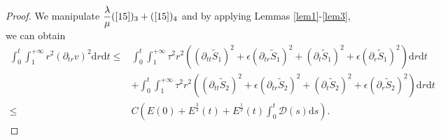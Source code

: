 \documentclass[10pt,reqno]{amsart}
\numberwithin{equation}{section}
\begin{document}
	\begin{proof}
		We manipulate $\dfrac{\lambda}{\mu}(\ref{15})_{3}+(\ref{15})_{4}$
		and by applying Lemmas \ref{lem1}-\ref{lem3}, we can obtain
		\begin{equation}\label{2dis1}
			\begin{aligned}
				\int_0^t\int_{1}^{+\infty}r^2(\partial_{tr}v)^2
				\mathrm{d}r\mathrm{d}t
				\leq&\int_0^t\int_{1}^{+\infty}\tau^2r^2((\partial_{tt}\tilde{S}_1)^2+\epsilon(\partial_{tr}\tilde{S}_1)^2+(\partial_{t}\tilde{S}_1)^2+\epsilon(\partial_{r}\tilde{S}_1)^2)\mathrm{d}r\mathrm{d}t\\
				&+\int_0^t\int_{1}^{+\infty}\tau^2r^2((\partial_{tt}\tilde{S}_2)^2+\epsilon(\partial_{tr}\tilde{S}_2)^2+(\partial_{t}\tilde{S}_2)^2+\epsilon(\partial_{r}\tilde{S}_2)^2)\mathrm{d}r\mathrm{d}t\\
				\leq& C(E(0)+E^{\frac{3}{2}}(t)+E^{\frac{1}{2}}(t)\int_{0}^{t} \mathcal{D}(s)\mathrm{d}s).
			\end{aligned}
		\end{equation}
		

\end{proof}
\end{document}
